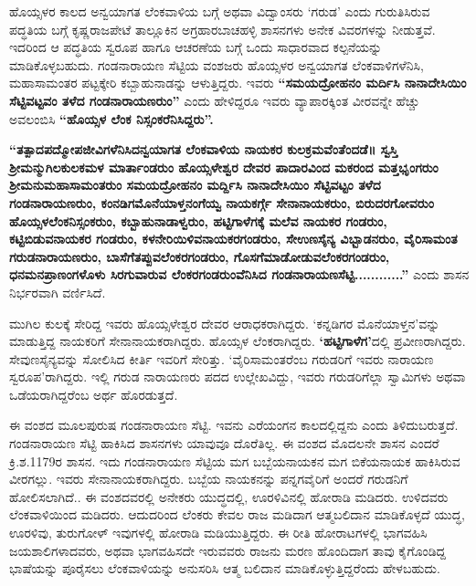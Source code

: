 \newpage

ಹೊಯ್ಸಳರ ಕಾಲದ ಅನ್ವಯಾಗತ ಲೆಂಕವಾಳಿಯ ಬಗ್ಗೆ ಅಥವಾ ವಿದ್ವಾಂಸರು ‘ಗರುಡ’ ಎಂದು ಗುರುತಿಸಿರುವ ಪದ್ಧತಿಯ ಬಗ್ಗೆ ಕೃಷ್ಣರಾಜಪೇಟೆ ತಾಲ್ಲೂಕಿನ ಅಗ್ರಹಾರಬಾಚಹಳ್ಳಿ ಶಾಸನಗಳು ಅನೇಕ ವಿವರಗಳನ್ನು ನೀಡುತ್ತವೆ. ಇದರಿಂದ ಆ ಪದ್ಧತಿಯ ಸ್ವರೂಪ ಹಾಗೂ ಆಚರಣೆಯ ಬಗ್ಗೆ ಒಂದು ಸಾಧಾರವಾದ ಕಲ್ಪನೆಯನ್ನು ಮಾಡಿಕೊಳ್ಳಬಹುದು. ಗಂಡನಾರಾಯಣ ಸೆಟ್ಟಿಯ ವಂಶಜರು ಹೊಯ್ಸಳರ ಅನ್ವಯಾಗತ ಲೆಂಕವಾಳಿಗಳೆನಿಸಿ, ಮಹಾಸಾಮಂತರ ಪಟ್ಟಕ್ಕೇರಿ ಕಬ್ಬಾಹುನಾಡನ್ನು ಆಳುತ್ತಿದ್ದರು. ಇವರು \textbf{“ಸಮಯದ್ರೋಹನಂ ಮರ್ದಿಸಿ ನಾನಾದೇಸಿಯಿಂ ಸೆಟ್ಟಿವಟ್ಟವಂ ತಳೆದ ಗಂಡನಾರಾಯಣರುಂ”} ಎಂದು ಹೇಳಿದ್ದರೂ ಇವರು ವ್ಯಾಪಾರಕ್ಕಿಂತ ವೀರವನ್ನೇ ಹೆಚ್ಚು ಅವಲಂಬಿಸಿ \textbf{“ಹೊಯ್ಸಳ ಲೆಂಕ ನಿಸ್ಸಂಕರೆನಿಸಿದ್ದರು”. }

\textbf{“ತತ್ಪಾದಪದ್ಮೋಪಜೀವಿಗಳೆನಿಸಿದನ್ವಯಾಗತ ಲೆಂಕವಾಳಿಯ ನಾಯಕರ ಕುಲಕ್ರಮವೆಂತೆಂದಡೆ॥ ಸ್ವಸ್ತಿ\general{\break } ಶ‍್ರೀಮನ್ಮುಗಿಲಕುಲಕಮಳ ಮಾರ್ತಾಂಡರುಂ ಹೊಯ್ಸಳೇಶ್ವರ ದೇವರ ಪಾದಾರವಿಂದ ಮಕರಂದ ಮತ್ತಭೃಂಗರುಂ\general{\break } ಶ‍್ರೀಮನುಮಹಾಸಾಮಂತರುಂ ಸಮಯದ್ರೋಹನಂ ಮರ್ದ್ದಿಸಿ ನಾನಾದೇಸಿಯಿಂ ಸೆಟ್ಟಿವಟ್ಟಂ ತಳೆದ ಗಂಡನಾರಾಯಣರುಂ, ಕಂನಡಿಗಮೊನೆಯಾಳ್ತನಂಗೆಯ್ವ ನಾಯಕರ್ಗ್ಗೆ ಸೇನಾನಾಯಕರುಂ, ಬಿರುದರಗೋವರುಂ ಹೊಯ್ಸಳಲೆಂಕನಿಸ್ಸಂಕರುಂ,\general{\break } ಕಬ್ಬಾಹುನಾಡಾಳ್ವರುಂ, ಹಟ್ಟಿಗಾಳೆಗಕ್ಕೆ ಮಲೆವ ನಾಯಕರ ಗಂಡರುಂ, ಕಟ್ಟಿಬಿಡುವನಾಯಕರ ಗಂಡರುಂ,\general{\break } ಕಳನೇರಿಯಿಳಿವನಾಯಕರಗಂಡರುಂ, ಸೇಉಣಸೈನ್ಯ ವಿಭ್ಬಾಡನರುಂ, ವೈರಿಸಾಮಂತ ಗರುಡನಾರಾಯಣರುಂ,\general{\break } ಬಾಸೆಗೆತಪ್ಪುವಲೆಂಕರಗಂಡರುಂ, ಗೊಸಗೆಮಾಡೋಡುವಲೆಂಕರಗಂಡರುಂ, ಧನಮನಪ್ರಾಣಂಗಳೊಳು ಸಿರಗುವಾರುವ\general{\break } ಲೆಂಕರಗಂಡರುಂವೆನಿಸಿದ ಗಂಡನಾರಾಯಣಸೆಟ್ಟಿ............”} ಎಂದು ಶಾಸನ ನಿರ್ಭರವಾಗಿ ವರ್ಣಿಸಿದೆ.

ಮುಗಿಲ ಕುಲಕ್ಕೆ ಸೇರಿದ್ದ ಇವರು ಹೊಯ್ಸಳೇಶ್ವರ ದೇವರ ಆರಾಧಕರಾಗಿದ್ದರು. ‘ಕನ್ನಡಿಗರ ಮೊನೆಯಾಳ್ತನ’ವನ್ನು ಮಾಡುತ್ತಿದ್ದ ನಾಯಕರಿಗೆ ಸೇನಾನಾಯಕರಾಗಿದ್ದರು. ಹೊಯ್ಸಳ ಲೆಂಕರಾಗಿದ್ದರು. \textbf{‘ಹಟ್ಟಿಗಾಳೆಗ’}ದಲ್ಲಿ ಪ್ರವೀಣರಾಗಿದ್ದರು. ಸೇವುಣಸೈನ್ಯವನ್ನು ಸೋಲಿಸಿದ ಕೀರ್ತಿ ಇವರಿಗೆ ಸೇರಿತ್ತು. ‘ವೈರಿಸಾಮಂತರೆಂಬ ಗರುಡರಿಗೆ ಇವರು ನಾರಾಯಣ ಸ್ವರೂಪ’ರಾಗಿದ್ದರು. ಇಲ್ಲಿ ಗರುಡ ನಾರಾಯಣರು ಪದದ ಉಲ್ಲೇಖವಿದ್ದು, ಇವರು ಗರುಡರಿಗೆಲ್ಲಾ ಸ್ವಾಮಿಗಳು ಅಥವಾ ಒಡೆಯರಾಗಿದ್ದರೆಂಬ ಅರ್ಥ ಹೊರಡುತ್ತದೆ.

ಈ ವಂಶದ ಮೂಲಪುರುಷ ಗಂಡನಾರಾಯಣ ಸೆಟ್ಟಿ. ಇವನು ಎರೆಯಂಗನ ಕಾಲದಲ್ಲಿದ್ದನು ಎಂದು ತಿಳಿದುಬರು\-ತ್ತದೆ. ಗಂಡನಾರಾಯಣ ಸೆಟ್ಟಿ ಹಾಕಿಸಿದ ಶಾಸನಗಳು ಯಾವುವೂ ದೊರೆತಿಲ್ಲ. ಈ ವಂಶದ ಮೊದಲನೇ ಶಾಸನ ಎಂದರೆ ಕ್ರಿ.ಶ.1179ರ ಶಾಸನ. ಇದು ಗಂಡನಾರಾಯಣ ಸೆಟ್ಟಿಯ ಮಗ ಬಬ್ಬೆಯನಾಯಕನ ಮಗ ಬಿಕೆಯನಾಯಕ ಹಾಕಿಸಿರುವ ವೀರಗಲ್ಲು. ಇವರು ಸೇನಾನಾಯಕರಾಗಿದ್ದರು. ಬಬ್ಬೆಯ ನಾಯಕನನ್ನು ಪನ್ನಗವೈರಿಗೆ ಅಂದರೆ ಗರುಡನಿಗೆ ಹೋಲಿಸಲಾಗಿದೆ.. ಈ ವಂಶದವರಲ್ಲಿ ಅನೇಕರು ಯುದ್ಧದಲ್ಲಿ, ಊರಳಿವಿನಲ್ಲಿ ಹೋರಾಡಿ ಮಡಿದರು. ಉಳಿದವರು ಲೆಂಕವಾಳಿಯಿಂದ ಮಡಿದರು. ಆದುದರಿಂದ ಲೆಂಕರು ಕೇವಲ ರಾಜ ಮಡಿದಾಗ ಆತ್ಮಬಲಿದಾನ ಮಾಡಿಕೊಳ್ಳದೆ ಯುದ್ಧ, ಊರಳಿವು, ತುರುಗೋಳ್​ ಇವುಗಳಲ್ಲಿ ಹೋರಾಡಿ ಮಡಿಯುತ್ತಿದ್ದರು. ಈ ರೀತಿ ಹೋರಾಟಗಳಲ್ಲಿ ಭಾಗವಹಿಸಿ ಜಯಶಾಲಿಗಳಾದವರು, ಅಥವಾ ಭಾಗವಹಿಸದೇ ಇರುವವರು ರಾಜನು ಮರಣ ಹೊಂದಿದಾಗ ತಾವು ಕೈಗೊಂಡಿದ್ದ ಭಾಷೆಯನ್ನು ಪೂರೈಸಲು ಲೆಂಕವಾಳಿಯನ್ನು ಅನುಸರಿಸಿ ಆತ್ಮ ಬಲಿದಾನ ಮಾಡಿಕೊಳ್ಳುತ್ತಿದ್ದರೆಂದು ಹೇಳಬಹುದು.

